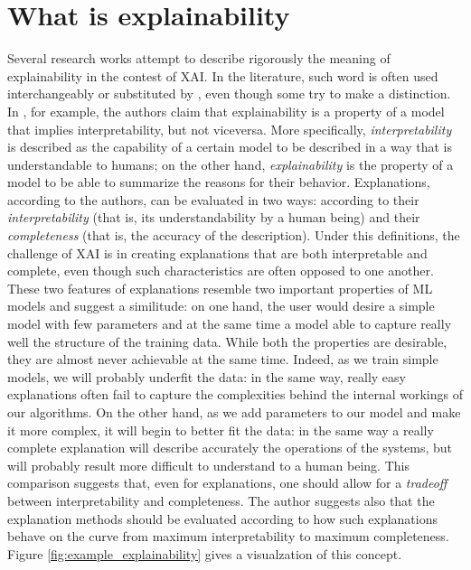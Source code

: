 \section{What is explainability}
Several research works attempt to describe rigorously the meaning of explainability in the contest of XAI. In the literature, such word is often used interchangeably or substituted by , even though some try to make a distinction. In \cite{gilpin2018explaining}, for example, the authors claim that explainability is a property of a model that implies interpretability, but not viceversa. More specifically, \textit{interpretability} is described as the capability of a certain model to be described in a  way that is understandable to humans; on the other hand, \textit{explainability} is the property of a model to be able to summarize the reasons for their behavior. Explanations, according to the authors, can be evaluated in two ways: according to their \textit{interpretability} (that is, its understandability by a human being) and their \textit{completeness} (that is, the accuracy of the description). Under this definitions, the challenge of XAI is in creating explanations that are both interpretable and complete, even though such characteristics are often opposed to one another. These two features of explanations resemble two important properties of ML models and suggest a similitude: on one hand, the user would desire a simple model with few parameters and at the same time a model able to capture really well the structure of the training data. While both the properties are desirable, they are almost never achievable at the same time. Indeed, as we train simple models, we will probably underfit the data: in the same way, really easy explanations often fail to capture the complexities behind the internal workings of our algorithms. On the other hand, as we add parameters to our model and make it more complex, it will begin to better fit the data: in the same way a really complete explanation will describe accurately the operations of the systems, but will probably result more difficult to understand to a human being. This comparison suggests that, even for explanations, one should allow for a \textit{tradeoff} between interpretability and completeness. The author suggests also that the explanation methods should be evaluated according to how such explanations behave on the curve from maximum interpretability to maximum completeness. Figure \ref{fig:example_explainability} gives a visualzation of this concept. 

